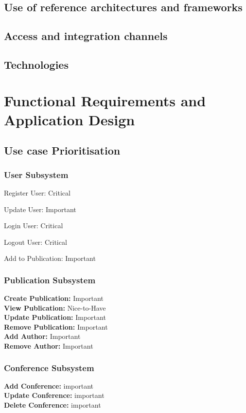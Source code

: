 \documentclass{article}
\begin{document}
		\subsection{Use of reference architectures and frameworks}

		\subsection{Access and integration channels}

		\subsection{Technologies}
		
	
	\section{Functional Requirements and Application Design}
		\subsection{Use case Prioritisation}
			\subsubsection{User Subsystem}
				Register User: Critical\par
				Update User: Important\par
				Login User: Critical\par
				Logout User: Critical\par
				Add to Publication: Important
			\subsubsection{Publication Subsystem}
			\textbf{Create Publication:} Important\\
			\textbf{View Publication:} Nice-to-Have\\
			\textbf{Update Publication:} Important\\
			\textbf{Remove Publication:} Important\\
			\textbf{Add Author:} Important\\
			\textbf{Remove Author:} Important\\
			\subsubsection{Conference Subsystem}
				\textbf{Add Conference:} important\\
				\textbf{Update Conference:} important\\
				\textbf{Delete Conference:} important
\end{document}
